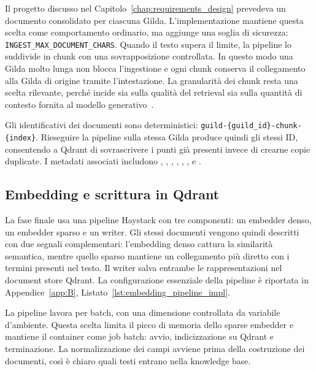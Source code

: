 Il progetto discusso nel Capitolo~\ref{chap:requirements_design} prevedeva un
documento consolidato per ciascuna Gilda. L'implementazione mantiene questa
scelta come comportamento ordinario, ma aggiunge una soglia di sicurezza:
\texttt{INGEST\_MAX\_DOCUMENT\_CHARS}. Quando il testo supera il limite, la
pipeline lo suddivide in chunk con una sovrapposizione controllata. In questo
modo una Gilda molto lunga non blocca l'ingestione e ogni chunk conserva il
collegamento alla Gilda di origine tramite l'intestazione. La granularità dei
chunk resta una scelta rilevante, perché incide sia sulla qualità del retrieval
sia sulla quantità di contesto fornita al modello
generativo~\cite{chen2023benchmarking}.

Gli identificativi dei documenti sono deterministici:
\texttt{guild-\{guild\_id\}-chunk-\{index\}}. Rieseguire la pipeline sulla
stessa Gilda produce quindi gli stessi ID, consentendo a Qdrant di sovrascrivere
i punti già presenti invece di crearne copie duplicate. I metadati associati
includono , ,
, ,
, ,
 e .

\subsection{Embedding e scrittura in Qdrant}
\label{subsec:implementation_embedding_write}

La fase finale usa una pipeline Haystack con tre componenti: un embedder denso,
un embedder sparso e un writer. Gli stessi documenti vengono quindi descritti
con due segnali complementari: l'embedding denso cattura la similarità semantica,
mentre quello sparso mantiene un collegamento più diretto con i termini presenti
nel testo. Il writer salva entrambe le rappresentazioni nel document store
Qdrant. La configurazione essenziale della pipeline è riportata in
Appendice~\ref{app:B},
Listato~\ref{lst:embedding_pipeline_impl}.

La pipeline lavora per batch, con una dimensione controllata da variabile
d'ambiente. Questa scelta limita il picco di memoria dello sparse embedder e
mantiene il container come job batch: avvio, indicizzazione su Qdrant e
terminazione. La normalizzazione dei campi avviene prima della costruzione dei
documenti, così è chiaro quali testi entrano nella knowledge base.

